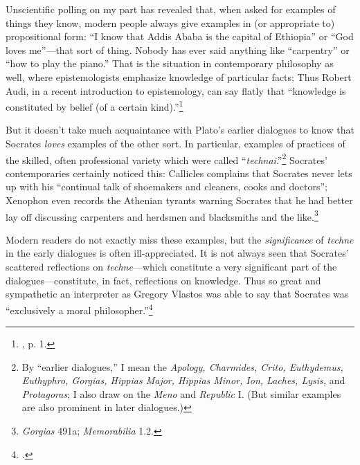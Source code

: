 ﻿\documentclass[11pt]{amsart}
\begin{document}
Unscientific polling on my part has revealed that, when asked for examples of things they know, modern people always give examples in (or appropriate to) propositional form: ``I know that Addis Ababa is the capital of Ethiopia'' or ``God loves me''---that sort of thing. Nobody has ever said anything like ``carpentry'' or ``how to play the piano.'' That is the situation in contemporary philosophy as well, where epistemologists emphasize knowledge of particular facts; Thus Robert Audi, in a recent introduction to epistemology, can say flatly that ``knowledge is constituted by belief (of a certain kind).''\footnote{\citet{huemer2002ecr}, p. 1.}

But it doesn't take much acquaintance with Plato's earlier dialogues to know that Socrates \emph{loves} examples of the other sort. In particular, examples of practices of the skilled, often professional variety which were called ``\emph{technai}.''\footnote{By ``earlier dialogues,'' I mean the \emph{Apology, Charmides, Crito, Euthydemus, Euthyphro, Gorgias, Hippias Major, Hippias Minor, Ion, Laches, Lysis,} and \emph{Protagoras}; I also draw on the \emph{Meno} and \emph{Republic} I. (But similar examples are also prominent in later dialogues.)} Socrates' contemporaries certainly noticed this: Callicles complains that Socrates never lets up with his ``continual talk of shoemakers and cleaners, cooks and doctors''; Xenophon even records the Athenian tyrants warning Socrates that he had better lay off discussing carpenters and herdsmen and blacksmiths and the like.\footnote{\emph{Gorgias} 491a; \emph{Memorabilia} 1.2.}





Modern readers do not exactly miss these examples, but the \emph{significance} of \emph{techne} in the early dialogues is often ill-appreciated. It is not always seen that Socrates' scattered reflections on \emph{techne}---which constitute a very significant part of the dialogues---constitute, in fact, reflections on knowledge. Thus so great and sympathetic an interpreter as Gregory Vlastos was able to say that Socrates was ``exclusively a moral philosopher.''\footnote{\citet[p.~41]{vlastos1991socrates}.}
\end{document}
